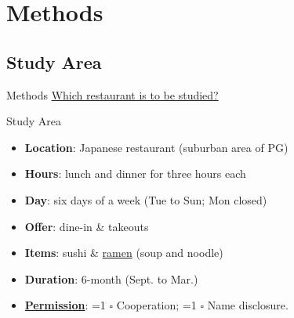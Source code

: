 \documentclass{beamer}
\newcommand{\checkbox}[1]{%
  \ifnum#1=1
    \makebox[0pt][l]{\raisebox{0.15ex}{\hspace{0.1em}$\checkmark$}}%
  \fi
  $\square$%
}
\begin{document}
\section{Methods}
\subsection{Study Area}
\begin{frame}{Methods}
    \underline{Which restaurant is to be studied?}
    \begin{block}{Study Area}
        \begin{itemize}
            \small
            \item \textbf{Location}: Japanese restaurant (suburban area of PG)
            \item \textbf{Hours}: lunch and dinner for three hours each
            \item \textbf{Day}: six days of a week (Tue to Sun; Mon closed)
            \item \textbf{Offer}: dine-in \& takeouts
            \item \textbf{Items}: sushi \& \underline{ramen} (soup and noodle)
            \item \textbf{Duration}: 6-month (Sept. to Mar.)
            \item \underline{\textbf{Permission}}: 
            \checkbox{1} Cooperation; \checkbox{0} Name disclosure.
        \end{itemize}
    \end{block}
        \begin{figure}
            \centering
            \qquad
        \end{figure}
\end{frame}

\end{document}
